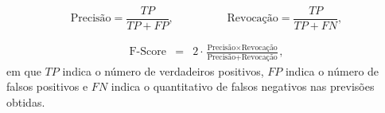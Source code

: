 \begin{equation*}
\textrm{Precisão} = \frac{TP}{TP + FP}, \hspace{2cm} \textrm{Revocação} = \frac{TP}{TP + FN},
\end{equation*}


\begin{eqnarray*}
\textrm{F-Score} &=&  2\cdot \frac{\textrm{Precisão} \times \textrm{Revocação}}{\textrm{Precisão} + \textrm{Revocação}},
\end{eqnarray*} em que $TP$ indica o número de verdadeiros positivos, $FP$ indica o número de falsos positivos e $FN$ indica o quantitativo de falsos negativos nas previsões obtidas.
